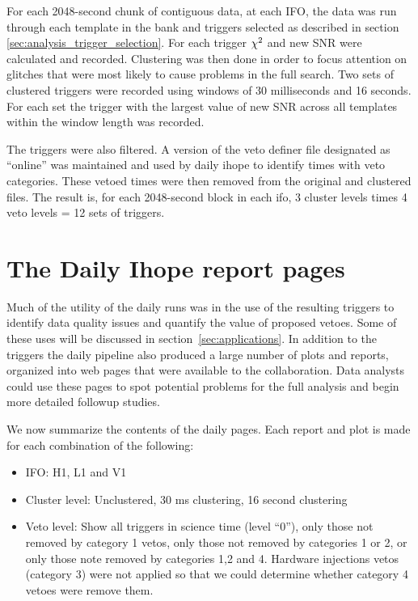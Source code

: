 For each 2048-second chunk of contiguous data, at each IFO, the data
was run through each template in the bank and triggers selected as
described in section \ref{sec:analysis_trigger_selection}. For each
trigger $\chi^2$ and new SNR were calculated and recorded.  Clustering
was then done in order to focus attention on glitches that were most
likely to cause problems in the full search.  Two sets of clustered
triggers were recorded using windows of 30 milliseconds and 16
seconds.  For each set the trigger with the largest value of new SNR
across all templates within the window length was recorded.

The triggers were also filtered.  A version of the veto definer file
designated as ``online'' was maintained and used by daily ihope to
identify times with veto categories.  These vetoed times were then
removed from the original and clustered files.  
The result is, for each 2048-second block in each ifo, 3 cluster
levels times 4 veto levels = 12 sets of triggers.



\section{The Daily Ihope report pages}

Much of the utility of the daily runs was in the use of the resulting
triggers to identify data quality issues and quantify the value of
proposed vetoes.  Some of these uses will be discussed in
section~\ref{sec:applications}.  In addition to the triggers the daily
pipeline also produced a large number of plots and reports, organized
into web pages that were available to the collaboration.  Data
analysts could use these pages to spot potential problems for the full
analysis and begin more detailed followup studies.  

We now summarize the contents of the daily pages. Each report and plot
is made for each combination of the following:

\begin{itemize}
\item IFO: H1, L1 and V1
\item Cluster level: Unclustered, 30 ms clustering, 16 second
clustering
\item Veto level: Show all triggers in science time (level ``0''),
only those not removed by category 1 vetos, only those not
removed by categories 1 or 2, or only those note removed by
categories 1,2 and 4.  Hardware injections vetos (category 3) were not 
applied so that we could determine whether category 4 vetoes were 
remove them.
\end{itemize}

